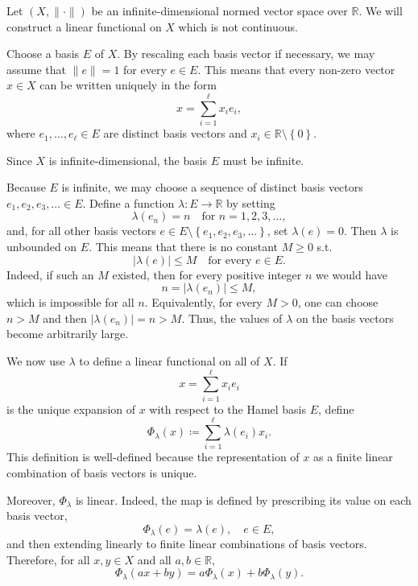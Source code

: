 \begin{eg}
    Let \((X, \lVert \cdot \rVert )\) be an infinite-dimensional normed vector space over \(\mathbb{R}\). We will construct a linear functional on \(X\) which is not continuous. 

    Choose a basis \(E\) of \(X\). By rescaling each basis vector if necessary, we may assume that \(\lVert e \rVert = 1\) for every \(e \in E\). This means that every non-zero vector \(x \in X\) can be written uniquely in the form 
    \[
        x = \sum_{i=1}^{\ell} x_i e_i, 
    \]       
    where \(e_1, \dots , e_{\ell } \in E\) are distinct basis vectors and \(x_i \in \mathbb{R} \setminus \left\{ 0 \right\} \). 

    Since \(X\) is infinite-dimensional, the basis \(E\) must be infinite.

    Because \(E\) is infinite, we may choose a sequence of distinct basis vectors \(e_1, e_2, e_3, \dots \in E\). Define a function \(\lambda : E \to \mathbb{R}\) by setting 
    \[
        \lambda (e_n) = n \quad \text{for } n = 1, 2, 3, \dots , 
    \]       
    and, for all other basis vectors \(e \in E \setminus \left\{ e_1, e_2, e_3, \dots  \right\} \), set \(\lambda (e) = 0\). Then \(\lambda \) is unbounded on \(E\). This means that there is no constant \(M \geq 0\) s.t.
    \[
        \vert \lambda (e) \vert \le M \quad \text{for every } e \in E.  
    \]     
    Indeed, if such an \(M\) existed, then for every positive integer \(n\) we would have 
    \[
        n = \vert \lambda (e_n) \vert \le M, 
    \]  
    which is impossible for all \(n\). Equivalently, for every \(M > 0\), one can choose \(n > M\) and then \(\vert \lambda (e_n) \vert = n > M \). Thus, the values of \(\lambda \) on the basis vectors become arbitrarily large. 

    We now use \(\lambda\) to define a linear functional on all of \(X\). If 
    \[
        x = \sum_{i=1}^{\ell } x_i e_i  
    \]       
    is the unique expansion of \(x\) with respect to the Hamel basis \(E\), define 
    \[
        \Phi_\lambda (x) \coloneqq \sum_{i=1}^{\ell } \lambda (e_i) x_i.  
    \]  
    This definition is well-defined because the representation of \(x\) as a finite linear combination of basis vectors is unique. 

    Moreover, \(\Phi _\lambda\) is linear. Indeed, the map is defined by prescribing its value on each basis vector,
    \[
        \Phi _\lambda (e) = \lambda (e), \quad e \in E,
    \]  
    and then extending linearly to finite linear combinations of basis vectors. Therefore, for all \(x, y \in X\) and all \(a, b \in \mathbb{R}\), 
    \[
        \Phi _\lambda (ax + by) = a \Phi _\lambda (x) + b \Phi _\lambda (y).
    \]  


\end{eg}
